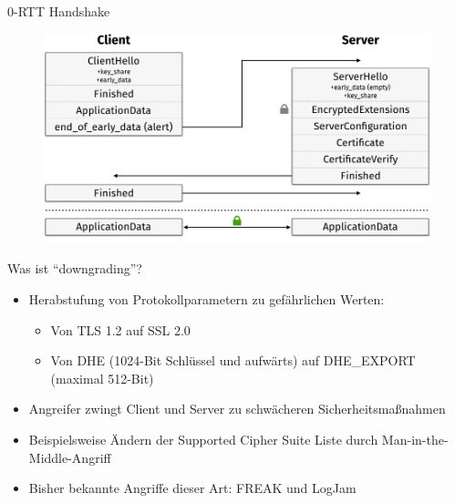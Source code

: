 \documentclass{f4_beamer_metropolis}
\begin{document}
\begin{frame}{0-RTT Handshake}
  \begin{figure}[!h]
    \centering
    \vspace*{-0.25cm}
    \includegraphics[width=\linewidth]{./images/tls13-handshake-zero-rtt.png}
    \label{fig:tls13-handshake-zero-rtt}
  \end{figure}
\end{frame}



\begin{frame}{Was ist \enquote{downgrading}?}
\begin{itemize}
  \item Herabstufung von Protokollparametern zu gefährlichen Werten:
  \begin{itemize}
    \item Von TLS 1.2 auf SSL 2.0
    \item Von DHE (1024-Bit Schlüssel und aufwärts) auf DHE_EXPORT (maximal 512-Bit)
  \end{itemize}
  \item Angreifer zwingt Client und Server zu schwächeren Sicherheitsmaßnahmen
  \item Beispielsweise Ändern der Supported Cipher Suite Liste durch Man-in-the-Middle-Angriff
  \item Bisher bekannte Angriffe dieser Art: FREAK und LogJam
\end{itemize}
\end{frame}
\end{document}
